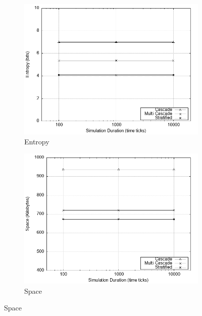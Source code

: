 \documentclass[logo,msc,cyber]{infthesis}   %
\begin{document}
\begin{figure}[h!]
    \centering
    \begin{subfigure}[b]{0.45\textwidth}
        \centering
        \includegraphics[width=\textwidth]{figures/baseline_simulation/simulator/baseline_simulator_entropy.png}
        \caption{Entropy}
        \label{fig:baseline-entropy}
    \end{subfigure}
    \hfill
    \begin{subfigure}[b]{0.45\textwidth}
        \centering
        \includegraphics[width=\textwidth]{figures/baseline_simulation/simulator/baseline_simulator_space.png}
        \caption{Space}
        \label{fig:baseline-space}
    \end{subfigure}

\end{figure}
\end{document}
